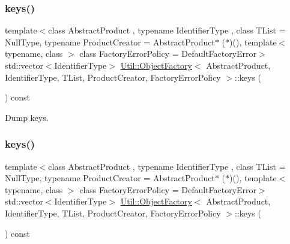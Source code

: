 \subsubsection{\texorpdfstring{keys()}{keys()}\hspace{0.1cm}{\footnotesize\ttfamily [1/3]}}
{\footnotesize\ttfamily template$<$class Abstract\+Product , typename Identifier\+Type , class T\+List  = Null\+Type, typename Product\+Creator  = Abstract\+Product$\ast$ ($\ast$)(), template$<$ typename, class $>$ class Factory\+Error\+Policy = Default\+Factory\+Error$>$ \\
std\+::vector$<$Identifier\+Type$>$ \mbox{\hyperlink{classUtil_1_1ObjectFactory}{Util\+::\+Object\+Factory}}$<$ Abstract\+Product, Identifier\+Type, T\+List, Product\+Creator, Factory\+Error\+Policy $>$\+::keys (\begin{DoxyParamCaption}{ }\end{DoxyParamCaption}) const\hspace{0.3cm}{\ttfamily [inline]}}



Dump keys. 

\mbox{\label{classUtil_1_1ObjectFactory_a10d2a7a76f67d69f545b7fc69fdc71e0}} 
\subsubsection{\texorpdfstring{keys()}{keys()}\hspace{0.1cm}{\footnotesize\ttfamily [2/3]}}
{\footnotesize\ttfamily template$<$class Abstract\+Product , typename Identifier\+Type , class T\+List  = Null\+Type, typename Product\+Creator  = Abstract\+Product$\ast$ ($\ast$)(), template$<$ typename, class $>$ class Factory\+Error\+Policy = Default\+Factory\+Error$>$ \\
std\+::vector$<$Identifier\+Type$>$ \mbox{\hyperlink{classUtil_1_1ObjectFactory}{Util\+::\+Object\+Factory}}$<$ Abstract\+Product, Identifier\+Type, T\+List, Product\+Creator, Factory\+Error\+Policy $>$\+::keys (\begin{DoxyParamCaption}{ }\end{DoxyParamCaption}) const\hspace{0.3cm}{\ttfamily [inline]}}



